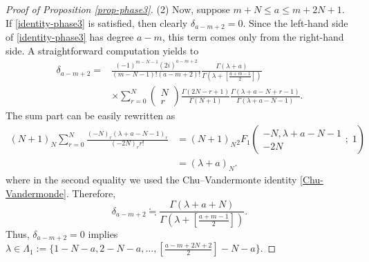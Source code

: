 \documentclass[12pt, pdflatex, a4paper]{article}
\theoremstyle{plain}
\theoremstyle{definition}
\begin{document}
\begin{proof}[Proof of Proposition \ref{prop-phase3}]
(2) Now, suppose $m+N \leq a \leq m+2N+1$. If \eqref{identity-phase3} is satisfied, then clearly $\delta_{a-m+2} = 0$. Since the left-hand side of \eqref{identity-phase3} has degree $a-m$, this term comes only from the right-hand side. A straightforward computation yields to
\begin{equation*}
\begin{aligned}
\delta_{a-m+2} = & \frac{(-1)^{m-N-1}(2i)^{a-m+2}}{(m-N-1)!(a-m+2)!}\frac{\Gamma(\lambda+a)}{\Gamma(\lambda+\left[\frac{a+m-1}{2}\right])}\\
& \times \sum_{r=0}^{N}\begin{pmatrix}
N\\
r
\end{pmatrix}
\frac{\Gamma(2N-r+1)}{\Gamma(N+1)}\frac{\Gamma(\lambda+a-N+r-1)}{\Gamma(\lambda+a-N-1)}.
\end{aligned}
\end{equation*}
The sum part can be easily rewritten as
\begin{equation*}
\begin{aligned}
(N+1)_N\sum_{r=0}^{N}\frac{(-N)_r(\lambda+a-N-1)_r}{(-2N)_r r!} & = (N+1)_N{}_2F_1\left(\begin{matrix}
-N, \lambda+a-N-1\\
-2N
\end{matrix}; \; 1 \right)\\
& = (\lambda+a)_N.
\end{aligned}
\end{equation*}
where in the second equality we used the Chu--Vandermonte identity \eqref{Chu-Vandermonde}.
Therefore,
\begin{equation*}
\delta_{a-m+2} \fallingdotseq \frac{\Gamma(\lambda+a+N)}{\Gamma(\lambda+\left[\frac{a+m-1}{2}\right])}.
\end{equation*}
Thus, $\delta_{a-m+2} = 0$ implies $\lambda \in \Lambda_1 := \{1-N-a, 2-N-a, \ldots, \left[\frac{a-m+2N+2}{2}\right] -N-a\}$.


\end{proof}
\end{document}
